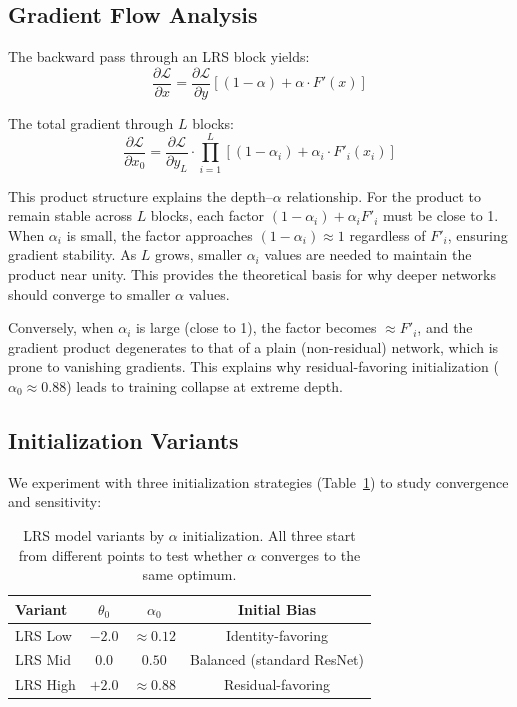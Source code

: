 \documentclass[preprint,12pt]{elsarticle}
\begin{document}
\subsection{Gradient Flow Analysis}

The backward pass through an LRS block yields:
\begin{equation}
    \frac{\partial \mathcal{L}}{\partial x} = \frac{\partial \mathcal{L}}{\partial y} \left[ (1 - \alpha) + \alpha \cdot F'(x) \right]
    \label{eq:grad}
\end{equation}

The total gradient through $L$ blocks:
\begin{equation}
    \frac{\partial \mathcal{L}}{\partial x_0} = \frac{\partial \mathcal{L}}{\partial y_L} \cdot \prod_{i=1}^{L} \left[ (1 - \alpha_i) + \alpha_i \cdot F'_i(x_i) \right]
    \label{eq:total_grad}
\end{equation}

This product structure explains the depth--$\alpha$ relationship. For the product to remain stable across $L$ blocks, each factor $(1 - \alpha_i) + \alpha_i F'_i$ must be close to 1. When $\alpha_i$ is small, the factor approaches $(1 - \alpha_i) \approx 1$ regardless of $F'_i$, ensuring gradient stability. As $L$ grows, smaller $\alpha_i$ values are needed to maintain the product near unity. This provides the theoretical basis for why deeper networks should converge to smaller $\alpha$ values.

Conversely, when $\alpha_i$ is large (close to 1), the factor becomes $\approx F'_i$, and the gradient product degenerates to that of a plain (non-residual) network, which is prone to vanishing gradients. This explains why residual-favoring initialization ($\alpha_0 \approx 0.88$) leads to training collapse at extreme depth.

\subsection{Initialization Variants}

We experiment with three initialization strategies (Table~\ref{tab:init_variants}) to study convergence and sensitivity:

\begin{table}[t]
\centering
\caption{LRS model variants by $\alpha$ initialization. All three start from different points to test whether $\alpha$ converges to the same optimum.}
\label{tab:init_variants}
\begin{tabular}{lccc}
\toprule
\textbf{Variant} & $\theta_0$ & $\alpha_0$ & \textbf{Initial Bias} \\
\midrule
LRS Low  & $-2.0$ & $\approx 0.12$ & Identity-favoring \\
LRS Mid  & $0.0$  & $0.50$         & Balanced (standard ResNet) \\
LRS High & $+2.0$  & $\approx 0.88$ & Residual-favoring \\
\bottomrule
\end{tabular}
\end{table}
\end{document}
